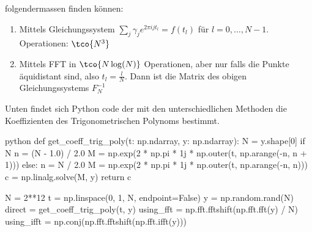 \rmvspace\rmvspace
folgendermassen finden können: 
\begin{enumerate}[label=(\arabic*)]
    \item Mittels Gleichungssystem $\sum_{j} \gamma_j e^{2\pi ijt_l} = f(t_l)$ für $l = 0, \ldots, N - 1$. Operationen: $\tco{N^3}$
    \item Mittels FFT in $\tco{N \log(N)}$ Operationen, aber nur falls die Punkte äquidistant sind, also $t_l = \frac{l}{N}$.
        Dann ist die Matrix des obigen Gleichungssystems $F^{-1}_N$
\end{enumerate}

\vspace{0.2cm}

Unten findet sich Python code der mit den unterschiedlichen Methoden die Koeffizienten des Trigonometrischen Polynoms bestimmt.
\rmvspace
\begin{code}{python}
    def get_coeff_trig_poly(t: np.ndarray, y: np.ndarray):
        N = y.shape[0]
        if N %
            n = (N - 1.0) / 2.0
            M = np.exp(2 * np.pi * 1j * np.outer(t, np.arange(-n, n + 1)))
        else:
            n = N / 2.0
            M = np.exp(2 * np.pi * 1j * np.outer(t, np.arange(-n, n)))
        c = np.linalg.solve(M, y)
        return c

    N = 2**12
    t = np.linspace(0, 1, N, endpoint=False)
    y = np.random.rand(N)
    direct = get_coeff_trig_poly(t, y)
    using_fft = np.fft.fftshift(np.fft.fft(y) / N)
    using_ifft = np.conj(np.fft.fftshift(np.fft.ifft(y)))
\end{code}
